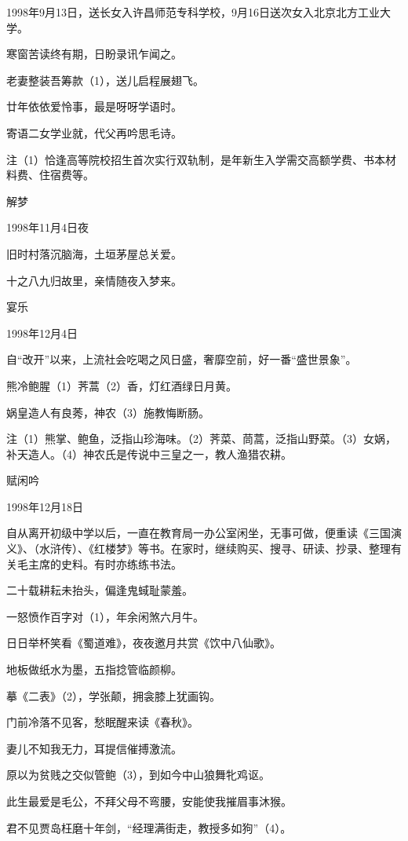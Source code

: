 \documentclass[../../dazhuan.tex]{subfiles}
\begin{document}
1998年9月13日，送长女入许昌师范专科学校，9月16日送次女入北京北方工业大学。

寒窗苦读终有期，日盼录讯乍闻之。

老妻整装吾筹款（1），送儿启程展翅飞。

廿年依依爱怜事，最是呀呀学语时。

寄语二女学业就，代父再吟思毛诗。

注（1）恰逢高等院校招生首次实行双轨制，是年新生入学需交高额学费、书本材料费、住宿费等。



解梦

1998年11月4日夜

旧时村落沉脑海，土垣茅屋总关爱。

十之八九归故里，亲情随夜入梦来。



宴乐

1998年12月4日

自“改开”以来，上流社会吃喝之风日盛，奢靡空前，好一番“盛世景象”。

熊冷鲍腥（1）荠蒿（2）香，灯红酒绿日月黄。

娲皇造人有良莠，神农（3）施教悔断肠。

注（1）熊掌、鲍鱼，泛指山珍海味。（2）荠菜、茼蒿，泛指山野菜。（3）女娲，补天造人。（4）神农氏是传说中三皇之一，教人渔猎农耕。



赋闲吟

1998年12月18日

自从离开初级中学以后，一直在教育局一办公室闲坐，无事可做，便重读《三国演义》、（水浒传）、《红楼梦》等书。在家时，继续购买、搜寻、研读、抄录、整理有关毛主席的史料。有时亦练练书法。

二十载耕耘未抬头，偏逢鬼蜮耻蒙羞。

一怒愤作百字对（1），年余闲煞六月牛。

日日举杯笑看《蜀道难》，夜夜邀月共赏《饮中八仙歌》。

地板做纸水为墨，五指捻管临颜柳。

摹《二表》（2），学张颠，拥衾膝上犹画钩。

门前冷落不见客，愁眠醒来读《春秋》。

妻儿不知我无力，耳提信催搏激流。

原以为贫贱之交似管鲍（3），到如今中山狼舞牝鸡讴。

此生最爱是毛公，不拜父母不弯腰，安能使我摧眉事沐猴。

君不见贾岛枉磨十年剑，“经理满街走，教授多如狗”（4）。
\end{document}
